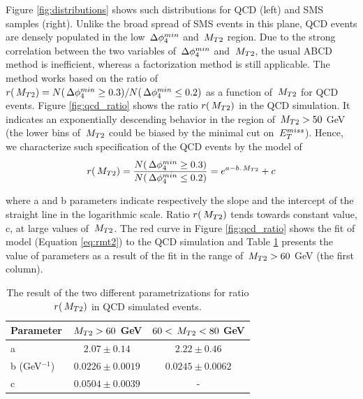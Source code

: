 Figure \ref{fig:distributions} shows such distributions for QCD (left) and SMS samples (right).
Unlike the broad spread of SMS events in this plane, QCD events are densely populated 
in the low $\,{\Delta\phi_{4}^{min}}$ and $\,{M_{T2}}$ region.
Due to the strong correlation between the two variables of $\,{\Delta\phi_{4}^{min}}$ and $\,{M_{T2}}$, 
the usual ABCD method is inefficient, whereas a factorization method \cite{MT2_2011} is still applicable.
The method works based on the ratio of $r(\,{M_{T2}}) = N (\,{\Delta\phi_{4}^{min}} \geq 0.3)/N (\,{\Delta\phi_{4}^{min}} \leq 0.2)$ 
as a function of $\,{M_{T2}}$ for QCD events. Figure \ref{fig:qcd_ratio} shows the ratio $r(\,{M_{T2}})$ in the QCD simulation. 
It indicates an exponentially descending behavior
in the region of $\,{M_{T2}} > 50$ GeV (the lower bins of $\,{M_{T2}}$ could be biased by the minimal cut on $\,{E_T^{miss}}$). 
Hence, we characterize such specification of the QCD events by the model 
of 
\begin{align}\label{eq:rmt2}
 r(\,{M_{T2}}) = \frac{N(\,{\Delta\phi_{4}^{min}} \geq 0.3)}{N(\,{\Delta\phi_{4}^{min}} \leq 0.2)} = e^{a-b.\,{M_{T2}}}+c
\end{align}

where a and b parameters indicate respectively the slope and the intercept of the straight line
 in the logarithmic scale. 
Ratio $r(\,{M_{T2}})$
tends towards 
constant value, c, at large values of $\,{M_{T2}}$.
The red curve in Figure \ref{fig:qcd_ratio} shows the fit of model (Equation \ref{eq:rmt2}) to the QCD simulation and 
Table \ref{tab:qcd_fit} presents the value of parameters as a result of the fit in the range of $\,{M_{T2}} > 60$ GeV (the first column). 

\begin{linenomath}
\begin{table}[h]
\begin{center}
\small
\begin{tabular}{l|cc}\hline\hline

Parameter & $\,{M_{T2}} > 60$ GeV & $60 < \,{M_{T2}} < 80$ GeV \\ \hline
a & $2.07\pm0.14$ & $2.22\pm0.46$ \\
b (GeV$^{-1}$) & $0.0226\pm0.0019$ & $0.0245\pm0.0062$ \\
c & $0.0504\pm0.0039$ & - \\ \hline\hline
\end{tabular}
\caption[Fit results for QCD]{The result of the two different parametrizations for ratio $r(\,{M_{T2}})$ in QCD simulated events.}  
\label{tab:qcd_fit}
\end{center}
\end{table}
\end{linenomath}


